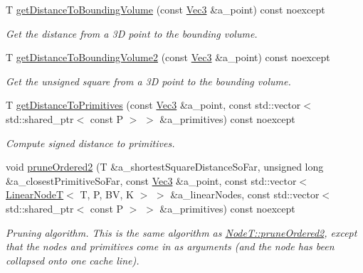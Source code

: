 \begin{DoxyCompactItemize}
T \hyperlink{classBVH_1_1LinearNodeT_a2bf5b1c514a20754d527b17e1c664630}{get\+Distance\+To\+Bounding\+Volume} (const \hyperlink{classBVH_1_1LinearNodeT_a073e87d51d44b4cc243c8f90690247a6}{Vec3} \&a\+\_\+point) const noexcept
\begin{DoxyCompactList}\small\item\em Get the distance from a 3D point to the bounding volume. \end{DoxyCompactList}\item 
T \hyperlink{classBVH_1_1LinearNodeT_a3e85605a1f0986b8440964ed0dbe90f6}{get\+Distance\+To\+Bounding\+Volume2} (const \hyperlink{classBVH_1_1LinearNodeT_a073e87d51d44b4cc243c8f90690247a6}{Vec3} \&a\+\_\+point) const noexcept
\begin{DoxyCompactList}\small\item\em Get the unsigned square from a 3D point to the bounding volume. \end{DoxyCompactList}\item 
T \hyperlink{classBVH_1_1LinearNodeT_a1a0a50ba8c1c0601f12ae02857246b1f}{get\+Distance\+To\+Primitives} (const \hyperlink{classBVH_1_1LinearNodeT_a073e87d51d44b4cc243c8f90690247a6}{Vec3} \&a\+\_\+point, const std\+::vector$<$ std\+::shared\+\_\+ptr$<$ const P $>$ $>$ \&a\+\_\+primitives) const noexcept
\begin{DoxyCompactList}\small\item\em Compute signed distance to primitives. \end{DoxyCompactList}\item 
\mbox{\label{classBVH_1_1LinearNodeT_a5479cd8a3503d16bb3f09273971df24a}} 
void \hyperlink{classBVH_1_1LinearNodeT_a5479cd8a3503d16bb3f09273971df24a}{prune\+Ordered2} (T \&a\+\_\+shortest\+Square\+Distance\+So\+Far, unsigned long \&a\+\_\+closest\+Primitive\+So\+Far, const \hyperlink{classBVH_1_1LinearNodeT_a073e87d51d44b4cc243c8f90690247a6}{Vec3} \&a\+\_\+point, const std\+::vector$<$ \hyperlink{classBVH_1_1LinearNodeT}{Linear\+NodeT}$<$ T, P, BV, K $>$ $>$ \&a\+\_\+linear\+Nodes, const std\+::vector$<$ std\+::shared\+\_\+ptr$<$ const P $>$ $>$ \&a\+\_\+primitives) const noexcept
\begin{DoxyCompactList}\small\item\em Pruning algorithm. This is the same algorithm as \hyperlink{classBVH_1_1NodeT_acb7fec40e06e97fcd42ec75169603e8b}{Node\+T\+::prune\+Ordered2}, except that the nodes and primitives come in as arguments (and the node has been collapsed onto one cache line). \end{DoxyCompactList}\end{DoxyCompactItemize}
